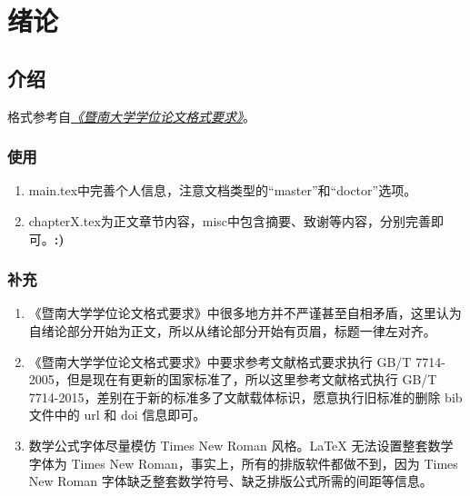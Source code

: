 \chapter{绪论}

\section{介绍}
格式参考自\emph{\href{https://law.jnu.edu.cn/\_upload/article/files/7f/3f/2212fa15450fbdf616c77b56ed00/107e1dae-6ce2-496d-96bf-fe013defe8c4.pdf}{《暨南大学学位论文格式要求》}}。



\subsection{使用}
\begin{enumerate}
    \item main.tex中完善个人信息，注意文档类型的“master”和“doctor”选项。
    \item chapterX.tex为正文章节内容，misc中包含摘要、致谢等内容，分别完善即可。\textbf{\huge :)}
\end{enumerate}



\subsection{补充}
\begin{enumerate}
    \item
    《暨南大学学位论文格式要求》中很多地方并不严谨甚至自相矛盾，这里认为自绪论部分开始为正文，所以从绪论部分开始有页眉，标题一律左对齐。
    \item
    《暨南大学学位论文格式要求》中要求参考文献格式要求执行 GB/T 7714-2005，但是现在有更新的国家标准了，所以这里参考文献格式执行 GB/T 7714-2015，差别在于新的标准多了文献载体标识，愿意执行旧标准的删除 bib 文件中的 url 和 doi 信息即可。
    \item
    数学公式字体尽量模仿 Times New Roman 风格\cite{knuth1984literate,knuth2014art}。LaTeX 无法设置整套数学字体为 Times New Roman，事实上，所有的排版软件都做不到，因为 Times New Roman 字体缺乏整套数学符号、缺乏排版公式所需的间距等信息\cite{liuhaiyang2013latexrumen}。
\end{enumerate}



